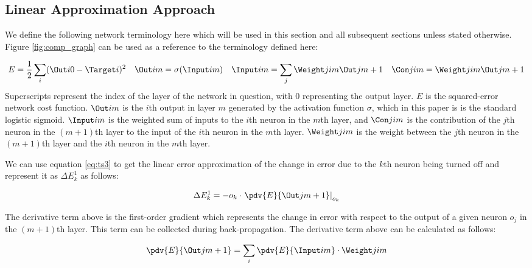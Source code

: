 \subsection{Linear Approximation Approach}

We define the following network terminology here which will be used in this section and all subsequent sections  unless stated otherwise. Figure \ref{fig:comp_graph} can be used as a reference to the terminology defined here:

\begin{align}
E &= \frac{1}{2}\sum\limits_i (\Out i 0 - \Target i)^2 &
\Out i m &= \sigma(\Input i m) &
\Input i m &= \sum\limits_j {\Weight j i m}{ \Out j {m + 1}} &
\Con j i m = \Weight j i m \Out j {m+1}\label{eq:term}
\end{align}
Superscripts represent the index of the layer of the network in question, with 0 representing the output layer. $E$ is the squared-error network cost function. $\Out i m$ is the $i$th output in layer $m$ generated by the activation function $\sigma$, which in this paper is is the standard logistic sigmoid. $\Input i m$ is the weighted sum of inputs to the $i$th neuron in the $m$th layer, and $\Con j i m$ is the contribution of the $j$th neuron in the $(m+1)$th layer to the input of the $i$th neuron in the $m$th layer. $\Weight j i m$ is the weight between the $j$th neuron in the $(m+1)$th layer and the $i$th neuron in the $m$th layer.

We can use equation \ref{eq:ts3} to get the linear error approximation of the change in error due to the $k$th neuron being turned off and represent it as $\Delta E_{k}^1$ as follows:

\begin{align}
\Delta E_{k}^1 = - o_k\cdot \left.\pdv{E}{{\Out j {m+1}}}\right|_{o_k}
\end{align}

The derivative term above is the first-order gradient which represents the change in error with respect to the output of a given neuron $o_j$ in the $(m+1)$th layer. This term can be collected during back-propagation. The derivative term above can be calculated as follows:

\begin{align}
\pdv{E}{{\Out j {m+1}}} = \sum\limits_i \pdv{E}{\Input i m}\cdot \Weight j i m
\end{align}
